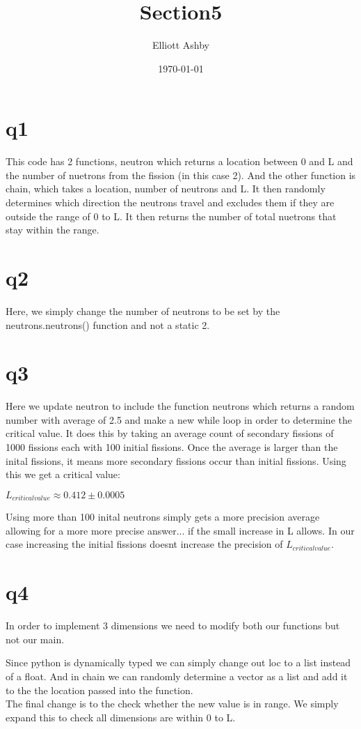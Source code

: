 \documentclass[a4paper,english]{article}
\title{Section5}
\author{Elliott Ashby}
\date{\today}
\begin{document}
    \maketitle
    \section{q1}
    
    This code has 2 functions, neutron which returns a location between 0 and L and the number of nuetrons from the fission
    (in this case 2). And the other function is chain, which takes a location, number of neutrons and L. It then randomly 
    determines which direction the neutrons travel and excludes them if they are outside the range of 0 to L. It then
    returns the number of total nuetrons that stay within the range.
    \\
    \section{q2}
    
    Here, we simply change the number of neutrons to be set by the neutrons.neutrons() function and not a static 2.
    \section{q3}
    
    Here we update neutron to include the function neutrons which returns a random number with average of 2.5 and make 
    a new while loop in order to determine the critical value. It does this by taking an average count of secondary fissions
    of 1000 fissions each with 100 initial fissions. Once the average is larger than the inital fissions, it means more 
    secondary fissions occur than initial fissions.
    Using this we get a critical value:
    \begin{center}
        $L_{critical value} \approx 0.412 \pm 0.0005$
    \end{center}
    Using more than 100 inital neutrons simply gets a more precision average allowing for a more more precise answer...
    if the small increase in L allows. In our case increasing the initial fissions doesnt increase the precision of
    $L_{critical value}$.
    \section{q4}
    In order to implement 3 dimensions we need to modify both our functions but not our main.
    
    Since python is dynamically typed we can simply change out loc to a list instead of a float. And in chain we can
    randomly determine a vector as a list and add it to the the location passed into the function.
    \\
    The final change is to the check whether the new value is in range. We simply expand this to check all dimensions are
    within 0 to L.
\end{document}
